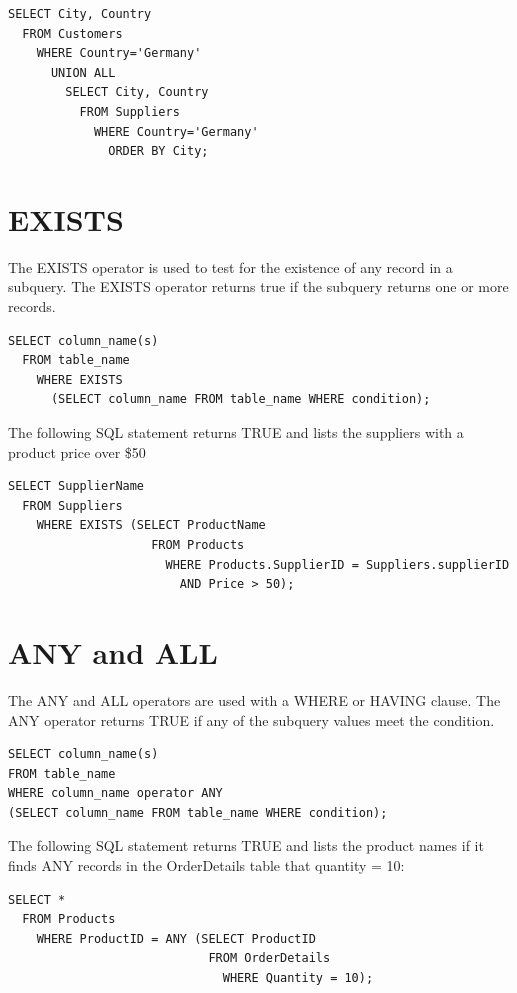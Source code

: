 \documentclass[
]{book}
\begin{document}
\begin{verbatim}
SELECT City, Country 
  FROM Customers
    WHERE Country='Germany'
      UNION ALL
        SELECT City, Country 
          FROM Suppliers
            WHERE Country='Germany'
              ORDER BY City;
\end{verbatim}

\hypertarget{exists}{%
\section{EXISTS}\label{exists}}

The EXISTS operator is used to test for the existence of any record in a subquery. The EXISTS operator returns true if the subquery returns one or more records.

\begin{verbatim}
SELECT column_name(s)
  FROM table_name
    WHERE EXISTS
      (SELECT column_name FROM table_name WHERE condition);
\end{verbatim}

The following SQL statement returns TRUE and lists the suppliers with a product price over \$50

\begin{verbatim}
SELECT SupplierName
  FROM Suppliers
    WHERE EXISTS (SELECT ProductName 
                    FROM Products 
                      WHERE Products.SupplierID = Suppliers.supplierID 
                        AND Price > 50);
\end{verbatim}

\hypertarget{any-and-all}{%
\section{ANY and ALL}\label{any-and-all}}

The ANY and ALL operators are used with a WHERE or HAVING clause. The ANY operator returns TRUE if any of the subquery values meet the condition.

\begin{verbatim}
SELECT column_name(s)
FROM table_name
WHERE column_name operator ANY
(SELECT column_name FROM table_name WHERE condition);
\end{verbatim}

The following SQL statement returns TRUE and lists the product names if it finds ANY records in the OrderDetails table that quantity = 10:

\begin{verbatim}
SELECT *
  FROM Products
    WHERE ProductID = ANY (SELECT ProductID
                            FROM OrderDetails 
                              WHERE Quantity = 10);
\end{verbatim}
\end{document}
